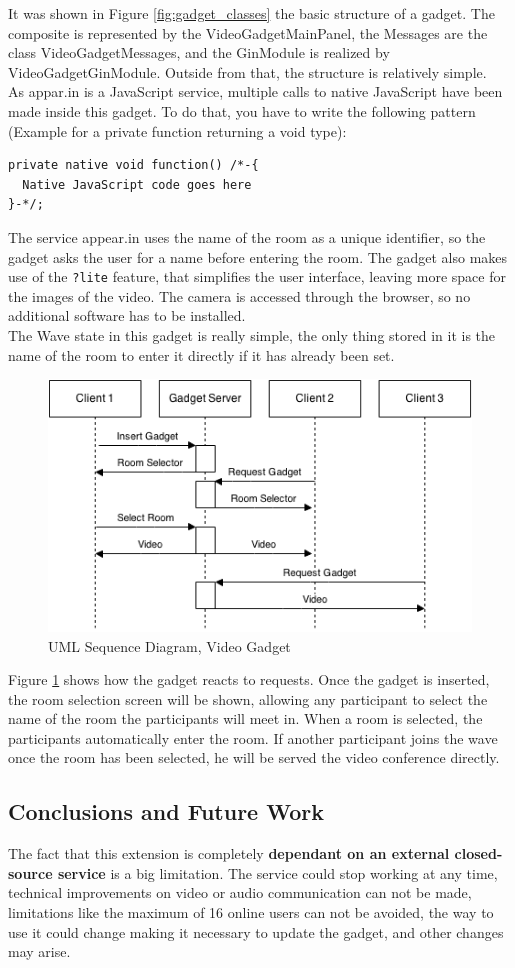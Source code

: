 It was shown in Figure \ref{fig:gadget_classes} the basic structure of a gadget. The composite is represented by the VideoGadgetMainPanel, the Messages are the class VideoGadgetMessages, and the GinModule is realized by VideoGadgetGinModule. Outside from that, the structure is relatively simple.\\[.2cm]
As appar.in is a JavaScript service, multiple calls to native JavaScript have been made inside this gadget. To do that, you have to write the following pattern (Example for a private function returning a void type):
\begin{verbatim}
private native void function() /*-{
  Native JavaScript code goes here
}-*/;
\end{verbatim}
The service appear.in uses the name of the room as a unique identifier, so the gadget asks the user for a name before entering the room. The gadget also makes use of the \verb|?lite| feature, that simplifies the user interface, leaving more space for the images of the video. The camera is accessed through the browser, so no additional software has to be installed.\\[.2cm]
The Wave state in this gadget is really simple, the only thing stored in it is the name of the room to enter it directly if it has already been set.\\[.2cm]
\begin{figure}[h]
  \center
    \includegraphics[keepaspectratio, scale=0.6]{Media/Diagrams/Gadget/VideoSequence.png}
  \caption{UML Sequence Diagram, Video Gadget}
  \label{fig:video_gadget_sequence}
\end{figure}
Figure \ref{fig:video_gadget_sequence} shows how the gadget reacts to requests. Once the gadget is inserted, the room selection screen will be shown, allowing any participant to select the name of the room the participants will meet in. When a room is selected, the participants automatically enter the room. If another participant joins the wave once the room has been selected, he will be served the video conference directly.
\subsection{Conclusions and Future Work}
The fact that this extension is completely \textbf{dependant on an external closed-source service} is a big limitation. The service could stop working at any time, technical improvements on video or audio communication can not be made, limitations like the maximum of 16 online users can not be avoided, the way to use it could change making it necessary to update the gadget, and other changes may arise.
